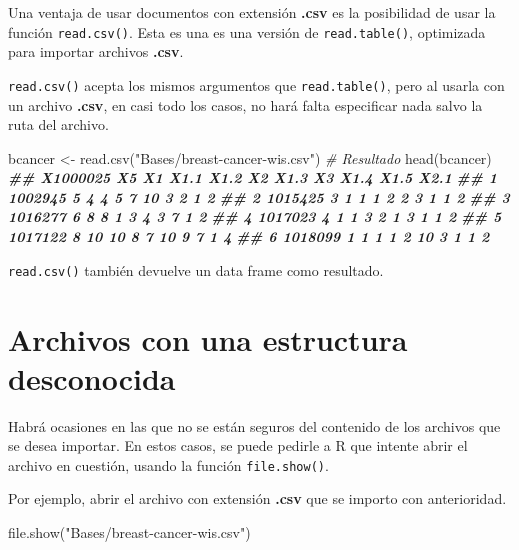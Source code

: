 \documentclass[
]{book}
\newenvironment{Shaded}{\begin{snugshade}}{\end{snugshade}}
\newcommand{\CommentTok}[1]{\textcolor[rgb]{0.56,0.35,0.01}{\textit{#1}}}
\newcommand{\DocumentationTok}[1]{\textcolor[rgb]{0.56,0.35,0.01}{\textbf{\textit{#1}}}}
\newcommand{\FunctionTok}[1]{\textcolor[rgb]{0.00,0.00,0.00}{#1}}
\newcommand{\NormalTok}[1]{#1}
\newcommand{\OtherTok}[1]{\textcolor[rgb]{0.56,0.35,0.01}{#1}}
\newcommand{\StringTok}[1]{\textcolor[rgb]{0.31,0.60,0.02}{#1}}
\begin{document}
Una ventaja de usar documentos con extensión \textbf{.csv} es la posibilidad de usar la función \texttt{read.csv()}. Esta es una es una versión de \texttt{read.table()}, optimizada para importar archivos \textbf{.csv}.

\texttt{read.csv()} acepta los mismos argumentos que \texttt{read.table()}, pero al usarla con un archivo \textbf{.csv}, en casi todo los casos, no hará falta especificar nada salvo la ruta del archivo.

\begin{Shaded}
\begin{Highlighting}[]
\NormalTok{bcancer }\OtherTok{\textless{}{-}} \FunctionTok{read.csv}\NormalTok{(}\StringTok{"Bases/breast{-}cancer{-}wis.csv"}\NormalTok{)}
\CommentTok{\# Resultado}
\FunctionTok{head}\NormalTok{(bcancer)}
\DocumentationTok{\#\#   X1000025 X5 X1 X1.1 X1.2 X2 X1.3 X3 X1.4 X1.5 X2.1}
\DocumentationTok{\#\# 1  1002945  5  4    4    5  7   10  3    2    1    2}
\DocumentationTok{\#\# 2  1015425  3  1    1    1  2    2  3    1    1    2}
\DocumentationTok{\#\# 3  1016277  6  8    8    1  3    4  3    7    1    2}
\DocumentationTok{\#\# 4  1017023  4  1    1    3  2    1  3    1    1    2}
\DocumentationTok{\#\# 5  1017122  8 10   10    8  7   10  9    7    1    4}
\DocumentationTok{\#\# 6  1018099  1  1    1    1  2   10  3    1    1    2}
\end{Highlighting}
\end{Shaded}

\texttt{read.csv()} también devuelve un data frame como resultado.

\hypertarget{archivos-con-una-estructura-desconocida}{%
\section{Archivos con una estructura desconocida}\label{archivos-con-una-estructura-desconocida}}

Habrá ocasiones en las que no se están seguros del contenido de los archivos que se desea importar. En estos casos, se puede pedirle a R que intente abrir el archivo en cuestión, usando la función \texttt{file.show()}.

Por ejemplo, abrir el archivo con extensión \textbf{.csv} que se importo con anterioridad.

\begin{Shaded}
\begin{Highlighting}[]
\FunctionTok{file.show}\NormalTok{(}\StringTok{"Bases/breast{-}cancer{-}wis.csv"}\NormalTok{)}
\end{Highlighting}
\end{Shaded}
\end{document}
